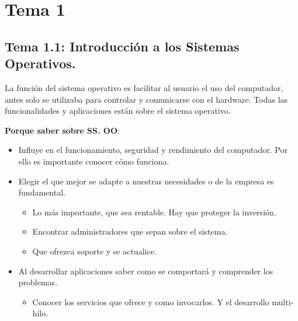 \documentclass[12pt, twoside, openright]{report} %
\begin{document}




\chapter{Tema 1}
\section{Tema 1.1: Introducción a los Sistemas Operativos.}


  
  La función del sistema operativo es facilitar al usuario el uso del
  computador, antes solo se utilizaba para controlar y comunicarse con
  el hardware. Todas las funcionalidades y aplicaciones están sobre el
  sistema operativo.
  
  
  \textbf{Porque saber sobre SS. OO}:
  

  \begin{itemize}
  \item Influye en el funcionamiento, seguridad y rendimiento del
    computador. Por ello es importante conocer cómo funciona.
    
  \item Elegir el que mejor se adapte a nuestras necesidades o de la empresa
    es fundamental.
    

    \begin{itemize}
    \item Lo más importante, que sea rentable. Hay que proteger la
      inversión.
      
    \item Encontrar administradores que sepan sobre el sistema.
      
    \item Que ofrezca soporte y se actualice.
      
    \end{itemize}
  \item Al desarrollar aplicaciones saber como se comportará y comprender
    los problemas.
    

    \begin{itemize}
    \item Conocer los servicios que ofrece y como invocarlos. Y el
      desarrollo multi-hilo.
      
    \end{itemize}
  \end{itemize}
  
\end{document}
